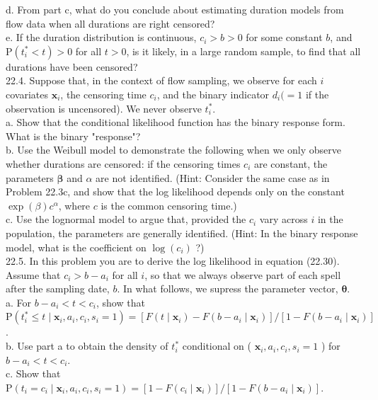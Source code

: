 \documentclass[10pt]{article}
\begin{document}
d. From part c, what do you conclude about estimating duration models from flow data when all durations are right censored?\\
e. If the duration distribution is continuous, $c_{i}>b>0$ for some constant $b$, and $\mathrm{P}\left(t_{i}^{*}<t\right)>0$ for all $t>0$, is it likely, in a large random sample, to find that all durations have been censored?\\
22.4. Suppose that, in the context of flow sampling, we observe for each $i$ covariates $\mathbf{x}_{i}$, the censoring time $c_{i}$, and the binary indicator $d_{i}(=1$ if the observation is uncensored). We never observe $t_{i}^{*}$.\\
a. Show that the conditional likelihood function has the binary response form. What is the binary "response"?\\
b. Use the Weibull model to demonstrate the following when we only observe whether durations are censored: if the censoring times $c_{i}$ are constant, the parameters $\boldsymbol{\beta}$ and $\alpha$ are not identified. (Hint: Consider the same case as in Problem 22.3c, and show that the log likelihood depends only on the constant $\exp (\beta) c^{\alpha}$, where $c$ is the common censoring time.)\\
c. Use the lognormal model to argue that, provided the $c_{i}$ vary across $i$ in the population, the parameters are generally identified. (Hint: In the binary response model, what is the coefficient on $\log \left(c_{i}\right)$ ?)\\
22.5. In this problem you are to derive the log likelihood in equation (22.30). Assume that $c_{i}>b-a_{i}$ for all $i$, so that we always observe part of each spell after the sampling date, $b$. In what follows, we supress the parameter vector, $\boldsymbol{\theta}$.\\
a. For $b-a_{i}<t<c_{i}$, show that $\mathrm{P}\left(t_{i}^{*} \leq t \mid \mathbf{x}_{i}, a_{i}, c_{i}, s_{i}=1\right)=\left[F\left(t \mid \mathbf{x}_{i}\right)-F\left(b-a_{i} \mid \mathbf{x}_{i}\right)\right] / \left[1-F\left(b-a_{i} \mid \mathbf{x}_{i}\right)\right]$.\\
b. Use part a to obtain the density of $t_{i}^{*}$ conditional on ( $\mathbf{x}_{i}, a_{i}, c_{i}, s_{i}=1$ ) for $b-a_{i}<t<c_{i}$.\\
c. Show that $\mathrm{P}\left(t_{i}=c_{i} \mid \mathbf{x}_{i}, a_{i}, c_{i}, s_{i}=1\right)=\left[1-F\left(c_{i} \mid \mathbf{x}_{i}\right)\right] /\left[1-F\left(b-a_{i} \mid \mathbf{x}_{i}\right)\right]$.\\
\end{document}
